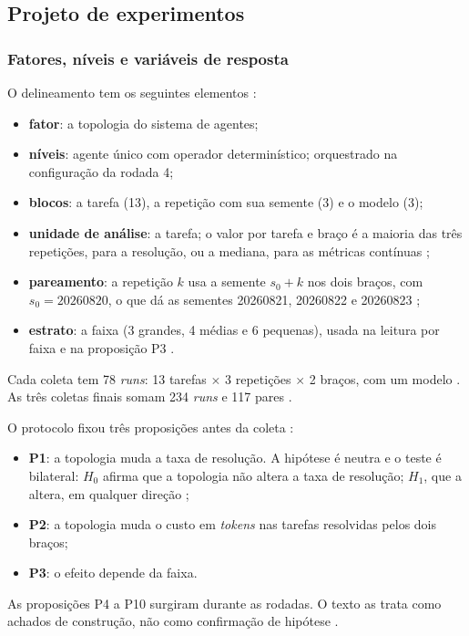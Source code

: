 \subsection{Projeto de experimentos}
\label{ssec:experimento}

\subsubsection{Fatores, níveis e variáveis de resposta}

\begin{novobloco}
O delineamento tem os seguintes elementos :

\begin{itemize}
    \item \textbf{fator}: a topologia do sistema de agentes;
    \item \textbf{níveis}: agente único com operador determinístico; orquestrado na configuração da rodada 4;
    \item \textbf{blocos}: a tarefa (13), a repetição com sua semente (3) e o modelo (3);
    \item \textbf{unidade de análise}: a tarefa; o valor por tarefa e braço é a maioria das três repetições, para a resolução, ou a mediana, para as métricas contínuas ;
    \item \textbf{pareamento}: a repetição $k$ usa a semente $s_0 + k$ nos dois braços, com $s_0 = 20260820$, o que dá as sementes 20260821, 20260822 e 20260823 ;
    \item \textbf{estrato}: a faixa (3 grandes, 4 médias e 6 pequenas), usada na leitura por faixa e na proposição P3 .
\end{itemize}

Cada coleta tem 78 \textit{runs}: 13 tarefas $\times$ 3 repetições $\times$ 2 braços, com um modelo . As três coletas finais somam 234 \textit{runs} e 117 pares .

O protocolo fixou três proposições antes da coleta :

\begin{itemize}
    \item \textbf{P1}: a topologia muda a taxa de resolução. A hipótese é neutra e o teste é bilateral: $H_0$ afirma que a topologia não altera a taxa de resolução; $H_1$, que a altera, em qualquer direção ;
    \item \textbf{P2}: a topologia muda o custo em \textit{tokens} nas tarefas resolvidas pelos dois braços;
    \item \textbf{P3}: o efeito depende da faixa.
\end{itemize}

As proposições P4 a P10 surgiram durante as rodadas. O texto as trata como achados de construção, não como confirmação de hipótese .
\end{novobloco}

